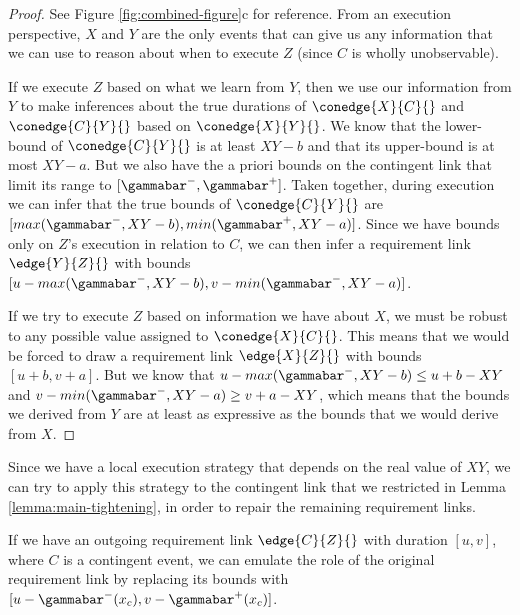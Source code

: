 \documentclass[11pt]{article}
\begin{document}
\begin{proof}
See Figure \ref{fig:combined-figure}c for reference. From an execution perspective, \(X\) and \(Y\) are
the only events that can give us any information that we can use to reason about when to execute \(Z\)
(since \(C\) is wholly unobservable).

If we execute \(Z\) based on what we learn from \(Y\), then we use our information from \(Y\) to make
inferences about the true durations of \(\conedge{X}{C}{}\) and \(\conedge{C}{Y}{}\) based on
\(\conedge{X}{Y}{}\). We know that the lower-bound of \(\conedge{C}{Y}{}\) is at least \(XY - b\) and that
its upper-bound is at most \(XY - a\). But we also have the a priori bounds on the contingent link
that limit its range to \([\gammabar^-, \gammabar^+]\). Taken together, during execution we can infer
that the true bounds of \(\conedge{C}{Y}{}\) are \([max(\gammabar^-, XY - b), min(\gammabar^+, XY -
a)]\). Since we have bounds only on \(Z\)'s execution in relation to \(C\), we can then infer a
requirement link \(\edge{Y}{Z}{}\) with bounds \([u - max(\gammabar^-, XY - b), v - min(\gammabar^-,
XY - a)]\).

If we try to execute \(Z\) based on information we have about \(X\), we must be robust to any possible
value assigned to \(\conedge{X}{C}{}\). This means that we would be forced to draw a requirement link
\(\edge{X}{Z}{}\) with bounds \([u+b, v+a]\). But we know that \(u - max(\gammabar^-, XY - b) \leq u +
b - XY\) and \(v - min(\gammabar^-, XY - a) \geq v + a - XY\), which means that the bounds we derived
from \(Y\) are at least as expressive as the bounds that we would derive from \(X\).
\end{proof}

Since we have a local execution strategy that depends on the real value of \(XY\), we can try to apply
this strategy to the contingent link that we restricted in Lemma \ref{lemma:main-tightening}, in
order to repair the remaining requirement links.

\begin{lemma}
\label{lemma:applied-execution}
If we have an outgoing requirement link \(\edge{C}{Z}{}\) with duration \([u, v]\), where \(C\) is a
contingent event, we can emulate the role of the original requirement link by replacing its bounds
with \([u - \gammabar^-(x_{c}), v - \gammabar^+(x_{c})]\).
\end{lemma}
\end{document}
